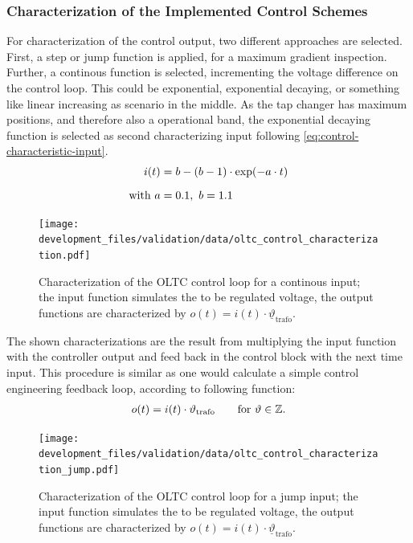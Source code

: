 \subsubsection{Characterization of the Implemented Control Schemes}

For characterization of the control output, two different approaches are selected.
First, a step or jump function is applied, for a maximum gradient inspection.
Further, a continous function is selected, incrementing the voltage difference on the control loop.
This could be exponential, exponential decaying, or something like linear increasing as scenario in the middle.
As the tap changer has maximum positions, and therefore also a operational band, the exponential decaying function is selected as second characterizing input following \autoref{eq:control-characteristic-input}.
\begin{align}
        i(t) &=b - (b-1) \cdot \exp(-a \cdot t) \label{eq:control-characteristic-input} \\[6pt]
        \text{with } a&=0.1,~b=1.1 \notag
\end{align}

\begin{figure}[htbp!]
        \centering
        \texttt{[image: development\_files/validation/data/oltc\_control\_characterization.pdf]}
        \caption[Characterization of the OLTC control loops for a continous input]{Characterization of the OLTC control loop for a continous input; the input function simulates the to be regulated voltage, the output functions are characterized by $o(t)=i(t) \cdot \underline{\vartheta}_\mathrm{trafo}$.}
        \label{fig:oltc-control-characterization}
\end{figure}

The shown characterizations are the result from multiplying the input function with the controller output and feed back in the control block with the next time input.
This procedure is similar as one would calculate a simple control engineering feedback loop, according to following function:
\begin{align}
        o(t)=i(t) \cdot \vartheta_\mathrm{trafo} \quad\quad \text{for }\vartheta \in \mathbb{Z}. \notag
\end{align}

\begin{figure}[htbp!]
        \centering
        \texttt{[image: development\_files/validation/data/oltc\_control\_characterization\_jump.pdf]}
        \caption[Characterization of the OLTC control loops for a jump input]{Characterization of the OLTC control loop for a jump input; the input function simulates the to be regulated voltage, the output functions are characterized by $o(t)=i(t) \cdot \underline{\vartheta}_\mathrm{trafo}$.}
        \label{fig:oltc-control-characterization-jump}
\end{figure}

